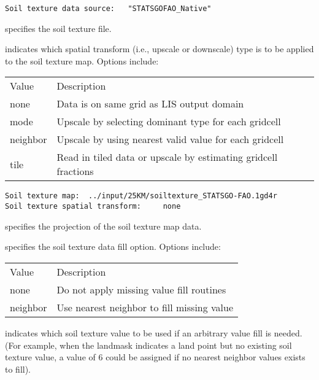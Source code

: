  \begin{Verbatim}[frame=single]
Soil texture data source:   "STATSGOFAO_Native"
 \end{Verbatim}

 
  specifies the soil texture file.

  indicates which spatial transform
 (i.e., upscale or downscale) type is to be applied to the soil texture
 map.  Options include:

 \begin{tabular}{ll}
 Value & Description                                          \\
 none  & Data is on same grid as LIS output domain            \\
 mode  & Upscale by selecting dominant type for each gridcell \\
 neighbor & Upscale by using nearest valid value for each gridcell \\
 tile  & Read in tiled data or upscale by estimating gridcell
         fractions                                            \\
 \end{tabular}
 

 \begin{Verbatim}[frame=single]
Soil texture map:  ../input/25KM/soiltexture_STATSGO-FAO.1gd4r 
Soil texture spatial transform:     none
 \end{Verbatim}

 
  specifies the projection of the
 soil texture map data.

  specifies the soil texture
  data fill option.  Options include:

 \begin{tabular}{ll}
 Value    & Description                                \\
 none     & Do not apply missing value fill routines   \\
 neighbor & Use nearest neighbor to fill missing value \\
 \end{tabular}

  indicates which soil texture 
 value to be used if an arbitrary value fill is needed. 
 (For example, when the landmask indicates a land point but no existing 
 soil texture value, a value of 6 could be assigned if 
 no nearest neighbor values exists to fill).

